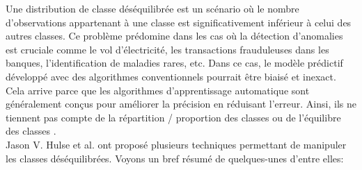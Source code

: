 \documentclass[12pt, french]{report}
\begin{document}
Une distribution de classe déséquilibrée est un scénario où le nombre d'observations appartenant à une classe est significativement inférieur à celui des autres classes. 
Ce problème prédomine dans les cas où la détection d'anomalies est cruciale comme le vol d'électricité, les transactions frauduleuses dans les banques, l'identification de maladies rares, etc. Dans ce cas, le modèle prédictif développé avec des algorithmes conventionnels pourrait être biaisé et inexact.\\
Cela arrive parce que les algorithmes d'apprentissage automatique sont généralement conçus pour améliorer la précision en réduisant l'erreur. Ainsi, ils ne tiennent pas compte de la répartition / proportion des classes ou de l'équilibre des classes .\\

Jason V. Hulse et al. \cite{key45} ont proposé plusieurs techniques permettant de manipuler les classes déséquilibrées. Voyons un bref résumé de quelques-unes d'entre elles:
\end{document}
